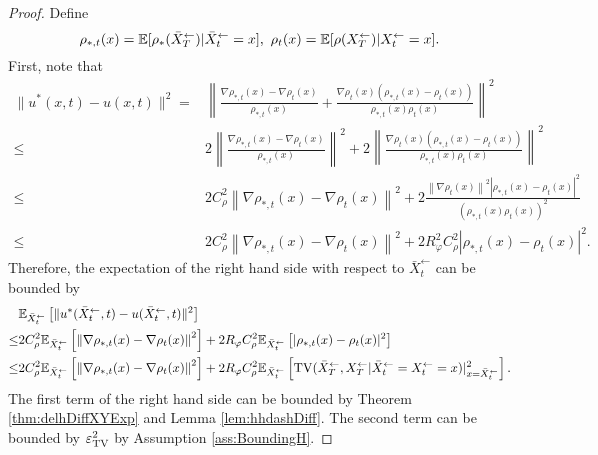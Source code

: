 \begin{proof}
Define 
$$
\rho_{*,t}(x) = \mathbb{E}[\rho_*(\bar{X}_{T}^\leftarrow) |  \bar{X}_{t}^\leftarrow = x],~\rho_{t}(x) = \mathbb{E}[\rho(X_{T}^\leftarrow) |  {X}_{t}^\leftarrow = x].
$$
First, note that 
\begin{align}
\| u^*(x,t) - u(x,t) \|^2= & 
\left\| \frac{ \nabla \rho_{*,t}(x) - \nabla \rho_{t}(x)
}{ \rho_{*,t}(x) } + \frac{\nabla \rho_{t}(x) (\rho_{*,t}(x) -\rho_{t}(x))
}{ \rho_{*,t}(x) \rho_t(x) } \right\|^2 \\
\leq & 
2 \left\| \frac{ \nabla \rho_{*,t}(x) - \nabla \rho_{t}(x)
}{ \rho_{*,t}(x) }\right\|^2  +
2 \left\| \frac{\nabla \rho_{t}(x) (\rho_{*,t}(x) -\rho_{t}(x))
}{ \rho_{*,t}(x) \rho_t(x) } \right\|^2 \\ 
\leq & 2 C_\rho^2 \left\| \nabla \rho_{*,t}(x) - \nabla \rho_{t}(x)\right\|^2  +
 2 \frac{\left\| \nabla \rho_{t}(x) \right\|^2 |\rho_{*,t}(x) -\rho_{t}(x)|^2 }{ (\rho_{*,t}(x) \rho_t(x))^2 }  \\
\leq & 2 C_\rho^2 \left\| \nabla \rho_{*,t}(x) - \nabla \rho_{t}(x)\right\|^2  +
 2 R_\varphi^2 C_\rho^2 |\rho_{*,t}(x) -\rho_{t}(x)|^2. 
\end{align}
Therefore, the expectation of the right hand side with respect to $\bar{X}_t^\leftarrow$ can be bounded by 
\begin{align}
& \mathbb{E}_{\bar{X}_t^\leftarrow} \left[ \| u^*(\bar{X}_t^\leftarrow,t) - u(\bar{X}_t^\leftarrow,t) \|^2\right]  \\ 
\leq &
2C_\rho^2 \mathbb{E}_{\bar{X}_t^\leftarrow} \left[  \left\| \nabla \rho_{*,t}(x) - \nabla \rho_{t}(x) \right\|^2 \right]
+ 2 R_\varphi C_\rho^2  \mathbb{E}_{\bar{X}_t^\leftarrow}\left[ |\rho_{*,t}(x) -\rho_{t}(x)|^2 \right] \\
\leq &
2C_\rho^2 \mathbb{E}_{\bar{X}_t^\leftarrow} \left[  \left\| \nabla \rho_{*,t}(x) - \nabla \rho_{t}(x) \right\|^2 \right]
+ 2 R_\varphi C_\rho^2  
\mathbb{E}_{\bar{X}_t^\leftarrow} \left[  \mathrm{TV}(\bar{X}_T^\leftarrow,X_T^\leftarrow | \bar{X}_t^\leftarrow = X_t^\leftarrow =x) |_{x  = \bar{X}_t^\leftarrow}^2  \right].
\end{align}
The first term of the right hand side can be bounded by Theorem \ref{thm:delhDiffXYExp} and Lemma \ref{lem:hhdashDiff}.  
The second term can be bounded by $\varepsilon_{\mathrm{TV}}^2$ by Assumption \ref{ass:BoundingH}. 


\end{proof}
